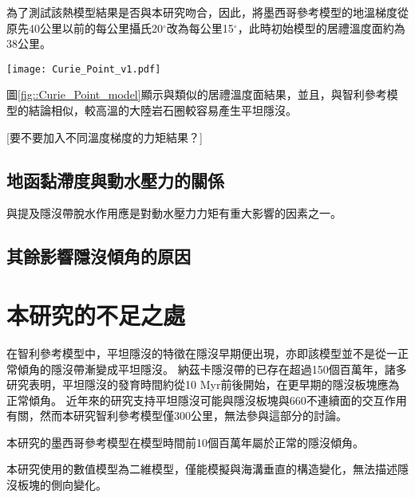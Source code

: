 為了測試該熱模型結果是否與本研究吻合，因此，將墨西哥參考模型的地溫梯度從原先40公里以前的每公里攝氏20$^\circ$改為每公里15$^\circ$，此時初始模型的居禮溫度面約為38公里。
\begin{figure*}[h]
    \centering
    \texttt{[image: Curie\_Point\_v1.pdf]}
    \caption[不同地溫梯度的墨西哥模型在30個百萬年的隱沒板塊構造與580$^\circ$等溫線]{不同地溫梯度的墨西哥模型在30個百萬年的隱沒板塊構造(黑線)於150公里以上之構造與580$^\circ$等溫線(紫線)，幾何形狀取自隱沒板塊頂部，使用5公里移動平均平滑離散化的網格。}
    \label{fig::Curie_Point_model}
\end{figure*}

圖\ref{fig::Curie_Point_model}顯示與\citealp{Manea2011Curie}類似的居禮溫度面結果，並且，與智利參考模型的結論相似，較高溫的大陸岩石圈較容易產生平坦隱沒。

[要不要加入不同溫度梯度的力矩結果？]


\subsection{地函黏滯度與動水壓力的關係}
\citealp{Manea2017}與\citealp{Yan2020}提及隱沒帶脫水作用應是對動水壓力力矩有重大影響的因素之一。

\subsection{其餘影響隱沒傾角的原因}

\section{本研究的不足之處}
在智利參考模型中，平坦隱沒的特徵在隱沒早期便出現，亦即該模型並不是從一正常傾角的隱沒帶漸變成平坦隱沒。
納茲卡隱沒帶的已存在超過150個百萬年，諸多研究表明，平坦隱沒的發育時間約從10 Myr前後開始，在更早期的隱沒板塊應為正常傾角。
近年來的研究支持平坦隱沒可能與隱沒板塊與660不連續面的交互作用有關，然而本研究智利參考模型僅300公里，無法參與這部分的討論。

本研究的墨西哥參考模型在模型時間前10個百萬年屬於正常的隱沒傾角。

本研究使用的數值模型為二維模型，僅能模擬與海溝垂直的構造變化，無法描述隱沒板塊的側向變化。